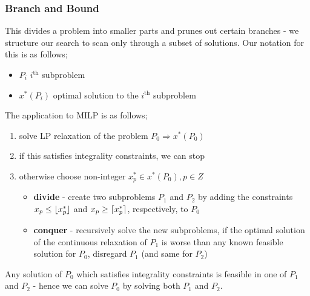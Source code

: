 \documentclass[a4paper, 12pt]{article}
\DeclarePairedDelimiter{\ceil}{\lceil}{\rceil}
\DeclarePairedDelimiter{\floor}{\lfloor}{\rfloor}
\begin{document}
            \subsubsection*{Branch and Bound}
                This divides a problem into smaller parts and prunes out certain branches - we structure our search to scan only through a subset of solutions.
                Our notation for this is as follows;
                \begin{itemize}
                    \itemsep0em
                    \item $P_i$ \hfill $i^\text{th}$ subproblem
                    \item $x^*(P_i)$ \hfill optimal solution to the $i^\text{th}$ subproblem
                \end{itemize}
                The application to MILP is as follows;
                \begin{enumerate}[1.]
                    \itemsep0em
                    \item solve LP relaxation of the problem $P_0 \Rightarrow x^*(P_0)$
                    \item if this satisfies integrality constraints, we can stop
                    \item otherwise choose non-integer $x^*_p \in x^*(P_0), p \in Z$
                        \begin{itemize}
                            \itemsep0em
                            \item \textbf{divide} - create two subproblems $P_1$ and $P_2$ by adding the constraints $x_p \leq \floor{x^*_p}$ and $x_p \geq \ceil{x^*_p}$, respectively, to $P_0$
                            \item \textbf{conquer} - recursively solve the new subproblems, if the optimal solution of the continuous relaxation of $P_1$ is worse than any known feasible solution for $P_0$, disregard $P_1$ (and same for $P_2$)
                        \end{itemize}
                \end{enumerate}
                Any solution of $P_0$ which satisfies integrality constraints is feasible in one of $P_1$ and $P_2$ - hence we can solve $P_0$ by solving both $P_1$ and $P_2$.
\end{document}
